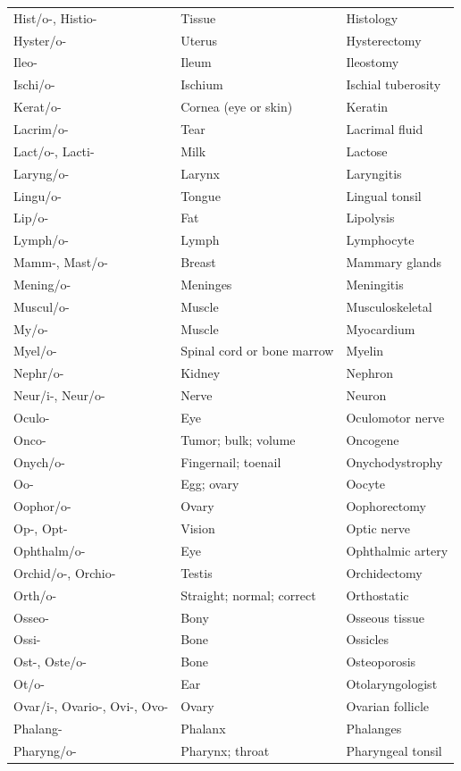 \begin{longtable}{>{\raggedright\arraybackslash}p{} >{\raggedright\arraybackslash}p{} >{\raggedright\arraybackslash}p{}}
Hist/o-, Histio- & Tissue & Histology \\
Hyster/o- & Uterus & Hysterectomy \\
Ileo- & Ileum & Ileostomy \\
Ischi/o- & Ischium & Ischial tuberosity \\
Kerat/o- & Cornea (eye or skin) & Keratin \\
Lacrim/o- & Tear & Lacrimal fluid \\
Lact/o-, Lacti- & Milk & Lactose \\
Laryng/o- & Larynx & Laryngitis \\
Lingu/o- & Tongue & Lingual tonsil \\
Lip/o- & Fat & Lipolysis \\
Lymph/o- & Lymph & Lymphocyte \\
Mamm-, Mast/o- & Breast & Mammary glands \\
Mening/o- & Meninges & Meningitis \\
Muscul/o- & Muscle & Musculoskeletal \\
My/o- & Muscle & Myocardium \\
Myel/o- & Spinal cord or bone marrow & Myelin \\
Nephr/o- & Kidney & Nephron \\
Neur/i-, Neur/o- & Nerve & Neuron \\
Oculo- & Eye & Oculomotor nerve \\
Onco- & Tumor; bulk; volume & Oncogene \\
Onych/o- & Fingernail; toenail & Onychodystrophy \\
Oo- & Egg; ovary & Oocyte \\
Oophor/o- & Ovary & Oophorectomy \\
Op-, Opt- & Vision & Optic nerve \\
Ophthalm/o- & Eye & Ophthalmic artery \\
Orchid/o-, Orchio- & Testis & Orchidectomy \\
Orth/o- & Straight; normal; correct & Orthostatic \\
Osseo- & Bony & Osseous tissue \\
Ossi- & Bone & Ossicles \\
Ost-, Oste/o- & Bone & Osteoporosis \\
Ot/o- & Ear & Otolaryngologist \\
Ovar/i-, Ovario-, Ovi-, Ovo- & Ovary & Ovarian follicle \\
Phalang- & Phalanx & Phalanges \\
Pharyng/o- & Pharynx; throat & Pharyngeal tonsil \\

\end{longtable}

